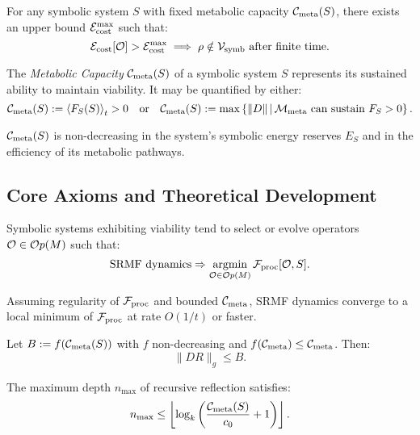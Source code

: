 \begin{proposition}
\label{prop:bk5_fixed_metabolic_capacity}
For any symbolic system $S$ with fixed metabolic capacity $\mathcal{C}_{\text{meta}}(S)$, there exists an upper bound $\mathcal{E}_{\text{cost}}^{\max}$ such that:
\[
\mathcal{E}_{\text{cost}}[\mathcal{O}] > \mathcal{E}_{\text{cost}}^{\max} \implies \rho \notin \mathcal{V}_{\mathrm{symb}} \ \text{after finite time}.
\]
\end{proposition}
\begin{definition} \label{definition:bk5_metabolic_capacity_mc_}

The \emph{Metabolic Capacity} $\mathcal{C}_{\text{meta}}(S)$ of a symbolic system $S$ represents its sustained ability to maintain viability. It may be quantified by either:
\[
\mathcal{C}_{\text{meta}}(S) := \left\langle F_S(S) \right\rangle_t > 0
\quad \text{or} \quad
\mathcal{C}_{\text{meta}}(S) := \max \left\{ \|D\| \,\middle|\, \mathcal{M}_{\mathrm{meta}} \text{ can sustain } F_S > 0 \right\}.
\]
\end{definition}
\begin{proposition}
\label{prop:bk5_metabolic_capacity_non_decreasing}
$\mathcal{C}_{\text{meta}}(S)$ is non-decreasing in the system's symbolic energy reserves $E_S$ and in the efficiency of its metabolic pathways.
\end{proposition}
\subsection*{Core Axioms and Theoretical Development}
\label{subsec:bk5_srmf_core_axioms}
\begin{axiom} \label{axiom:bk5_srmf_operator_selection_evolution}
Symbolic systems exhibiting viability tend to select or evolve operators $\mathcal{O} \in \mathcal{O}p(M)$ such that:
\[
\text{SRMF dynamics} \Rightarrow \mathop{\mathrm{argmin}}_{\mathcal{O} \in \mathcal{O}p(M)} \mathcal{F}_{\text{proc}}[\mathcal{O}, S].
\]
\end{axiom}
\begin{theorem}
\label{theorem:bk5_operator_convergence}
Assuming regularity of $\mathcal{F}_{\text{proc}}$ and bounded $\mathcal{C}_{\text{meta}}$, SRMF dynamics converge to a local minimum of $\mathcal{F}_{\text{proc}}$ at rate $O(1/t)$ or faster.
\end{theorem}
\begin{axiom}
\label{axiom:bk5_metabolically_bounded_reflection}
Let $B := f(\mathcal{C}_{\text{meta}}(S))$ with $f$ non-decreasing and $f(\mathcal{C}_{\text{meta}}) \leq \mathcal{C}_{\text{meta}}$. Then:
\[
\| D R \|_g \leq B.
\]
\end{axiom}
\begin{corollary} \label{corollary:bk5__metabolically_bounded_reflection_corollary}
The maximum depth $n_{\max}$ of recursive reflection satisfies:
\[
n_{\max} \leq \left\lfloor \log_k\left(\frac{\mathcal{C}_{\text{meta}}(S)}{c_0} + 1\right) \right\rfloor.
\]
\end{corollary}
